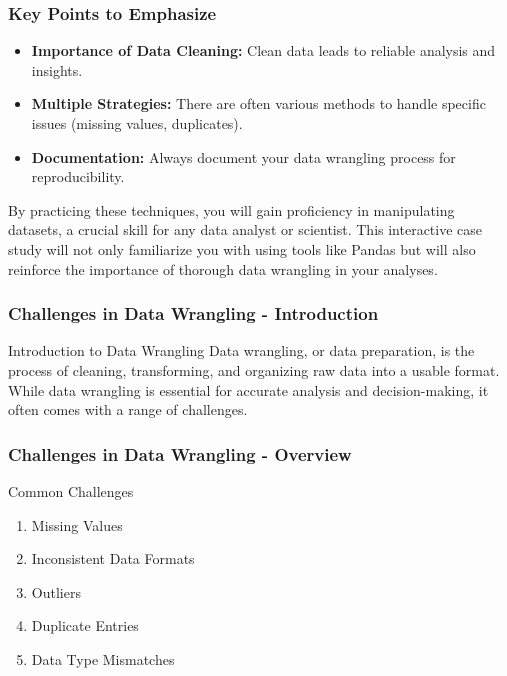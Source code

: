 \documentclass[aspectratio=169]{beamer}
\begin{document}
\begin{frame}
    \frametitle{Key Points to Emphasize}
    \begin{itemize}
        \item \textbf{Importance of Data Cleaning:} Clean data leads to reliable analysis and insights.
        \item \textbf{Multiple Strategies:} There are often various methods to handle specific issues (missing values, duplicates).
        \item \textbf{Documentation:} Always document your data wrangling process for reproducibility.
    \end{itemize}
    
    By practicing these techniques, you will gain proficiency in manipulating datasets, a crucial skill for any data analyst or scientist. This interactive case study will not only familiarize you with using tools like Pandas but will also reinforce the importance of thorough data wrangling in your analyses.
\end{frame}

\begin{frame}[fragile]
    \frametitle{Challenges in Data Wrangling - Introduction}
    \begin{block}{Introduction to Data Wrangling}
        Data wrangling, or data preparation, is the process of cleaning, transforming, and organizing raw data into a usable format. While data wrangling is essential for accurate analysis and decision-making, it often comes with a range of challenges.
    \end{block}
\end{frame}

\begin{frame}[fragile]
    \frametitle{Challenges in Data Wrangling - Overview}
    \begin{block}{Common Challenges}
        \begin{enumerate}
            \item Missing Values
            \item Inconsistent Data Formats
            \item Outliers
            \item Duplicate Entries
            \item Data Type Mismatches
        \end{enumerate}
    \end{block}
\end{frame}
\end{document}
